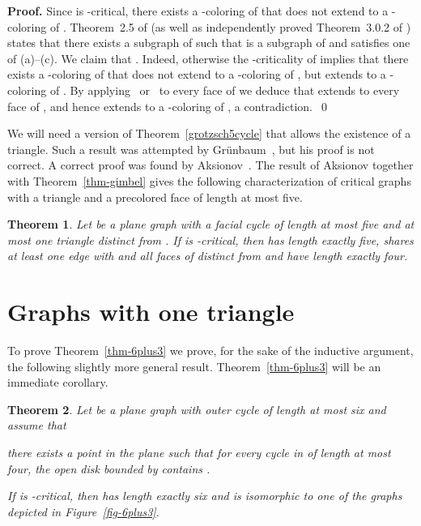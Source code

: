 \documentclass{article}
\def\mytextindent#1{\indent\indent\llap{\rm#1\enspace}\ignorespaces}
\def\myitem{\par\hangindent30pt\mytextindent}
\let\ppar=\par
\def\mylabel#1{{\label{#1}}}
\newtheorem{theorem}{Theorem}
\begin{document}
\noindent
{\bf Proof.}
Since  is -critical, there exists a -coloring of  that
does not extend to a -coloring of .
Theorem~2.5 of \cite{thom-surf} (as well as independently proved Theorem~3.0.2 of \cite{WalPhD})
states that there exists a subgraph  of 
such that  is a subgraph of  and  satisfies one of (a)--(c).
We claim that . Indeed, otherwise the -criticality of 
implies that there exists a -coloring of  that does not extend to
a -coloring of , but extends to a -coloring  of .
By applying~\cite[Theorem~2.5]{thom-surf} or~\cite[Theorem~3.0.2]{WalPhD}  
to every face of 
we deduce that  extends to every face of , and hence extends
to a -coloring of , a contradiction.~\qed
\bigskip

We will need a version of Theorem~\ref{grotzsch5cycle} that allows
the existence of a triangle.
Such a result was attempted by Gr\"unbaum~\cite{grunbaum}, but his proof
is not correct.
A correct proof was found by Aksionov~\cite{aksenov}.  
The result of Aksionov together with Theorem~\ref{thm-gimbel}
gives the following characterization of critical graphs with a triangle 
and a precolored face of length at most five.

\begin{theorem}\label{thm-planetr}
Let  be a plane graph with a facial cycle  of length at most five and at 
most one triangle  distinct from .
If  is -critical, then  has length exactly five, 
 shares at least one edge
with  and all faces of  distinct from  and  have length exactly four.
\end{theorem}

\section{Graphs with one triangle}\label{sec-6plus3}


To prove Theorem~\ref{thm-6plus3} we prove, for the sake of the
inductive argument, the following slightly more general result.
Theorem~\ref{thm-6plus3} will be an immediate corollary.

\begin{theorem}
\mylabel{thm-6plus3new}
Let  be a plane graph with outer cycle  of length at most six
and assume that
\myitem{()}there exists a point  in the plane such that for every cycle  in  
   of length at most four, the open disk bounded by  contains .\ppar
\noindent
If  is -critical, then 
 has length exactly six
and  is isomorphic to one of the graphs depicted in Figure~\ref{fig-6plus3}.
\end{theorem}
\end{document}

